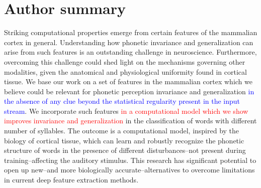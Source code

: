 \documentclass[10pt,letterpaper]{article}
\begin{document}
\section*{Author summary}


Striking computational properties emerge from certain features of the mammalian cortex in general. Understanding how phonetic invariance and generalization can arise from such features is an outstanding challenge in neuroscience. Furthermore, overcoming this challenge could shed light on the mechanisms governing other modalities, given the anatomical and physiological uniformity found in cortical tissue. We base our work on a set of features in the mammalian cortex which we believe could be relevant for phonetic perception invariance and generalization \textcolor{blue}{in the absence of any clue beyond the statistical regularity present in the input stream}. We incorporate such features \textcolor{red}{in a computational model which we show improves invariance and generalization} in the classification of words with different number of syllables. The outcome is a computational model, inspired by the biology of cortical tissue, which can learn and robustly recognize the phonetic structure of words in the presence of different disturbances--not present during training--affecting the auditory stimulus. This research has significant potential to open up new--and more biologically accurate--alternatives to overcome limitations in current deep feature extraction methods.
\end{document}
